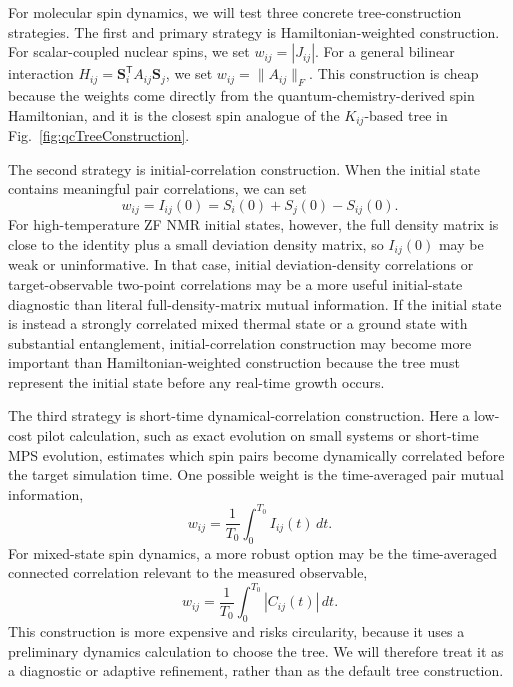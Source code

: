 \documentclass[12pt]{article}
\begin{document}
For molecular spin dynamics, we will test three concrete tree-construction strategies.
The first and primary strategy is Hamiltonian-weighted construction.
For scalar-coupled nuclear spins, we set \(w_{ij}=|J_{ij}|\).
For a general bilinear interaction \(H_{ij}=\mathbf S_i^{\mathsf T}A_{ij}\mathbf S_j\), we set \(w_{ij}=\|A_{ij}\|_F\).
This construction is cheap because the weights come directly from the quantum-chemistry-derived spin Hamiltonian, and it is the closest spin analogue of the \(K_{ij}\)-based tree in Fig.~\ref{fig:qcTreeConstruction}.

The second strategy is initial-correlation construction.
When the initial state contains meaningful pair correlations, we can set
\begin{equation}
w_{ij}=I_{ij}(0)=S_i(0)+S_j(0)-S_{ij}(0).
\end{equation}
For high-temperature ZF NMR initial states, however, the full density matrix is close to the identity plus a small deviation density matrix, so \(I_{ij}(0)\) may be weak or uninformative.
In that case, initial deviation-density correlations or target-observable two-point correlations may be a more useful initial-state diagnostic than literal full-density-matrix mutual information.
If the initial state is instead a strongly correlated mixed thermal state or a ground state with substantial entanglement, initial-correlation construction may become more important than Hamiltonian-weighted construction because the tree must represent the initial state before any real-time growth occurs.

The third strategy is short-time dynamical-correlation construction.
Here a low-cost pilot calculation, such as exact evolution on small systems or short-time MPS evolution, estimates which spin pairs become dynamically correlated before the target simulation time.
One possible weight is the time-averaged pair mutual information,
\begin{equation}
w_{ij}=\frac{1}{T_0}\int_0^{T_0} I_{ij}(t)\,dt.
\end{equation}
For mixed-state spin dynamics, a more robust option may be the time-averaged connected correlation relevant to the measured observable,
\begin{equation}
w_{ij}=\frac{1}{T_0}\int_0^{T_0} |C_{ij}(t)|\,dt.
\end{equation}
This construction is more expensive and risks circularity, because it uses a preliminary dynamics calculation to choose the tree.
We will therefore treat it as a diagnostic or adaptive refinement, rather than as the default tree construction.
\end{document}
